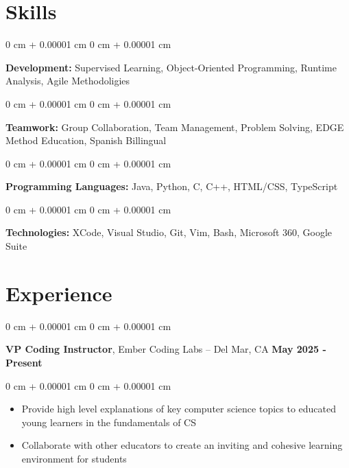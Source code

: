 \documentclass[10pt, letterpaper]{article}
\newenvironment{highlights}{
    \begin{itemize}[
        topsep=0.10 cm,
        parsep=0.10 cm,
        partopsep=0pt,
        itemsep=0pt,
        leftmargin=0 cm + 10pt
    ]
}{
    \end{itemize}
} %
\newenvironment{onecolentry}{
    \begin{adjustwidth}{
        0 cm + 0.00001 cm
    }{
        0 cm + 0.00001 cm
    }
}{
    \end{adjustwidth}
} %
\newenvironment{twocolentry}[2][]{
    \onecolentry%
    \def\secondColumn{#2}
    \setcolumnwidth{\fill, 6.0 cm}
    \begin{paracol}{2}
}{
    \switchcolumn\raggedleft\secondColumn%
    \end{paracol}
    \endonecolentry%
} %
\begin{document}
    
    
    {\color{secondaryColor}\section{Skills}}
        
        \begin{onecolentry}
            \textbf{Development:} Supervised Learning, Object-Oriented Programming, Runtime Analysis, Agile Methodoligies
        \end{onecolentry}

        \vspace{0.10 cm}

        \begin{onecolentry}
            \textbf{Teamwork:} Group Collaboration, Team Management, Problem Solving, EDGE Method Education, Spanish Billingual
        \end{onecolentry}

        \vspace{0.10 cm}
        
        \begin{onecolentry}
            \textbf{Programming Languages:} Java, Python, C, C++, HTML/CSS, TypeScript
        \end{onecolentry}

        \vspace{0.10 cm}
        
        \begin{onecolentry}
            \textbf{Technologies:} XCode, Visual Studio, Git, Vim, Bash, Microsoft 360, Google Suite
        \end{onecolentry}
    
    {\color{secondaryColor}\section{Experience}}


        
        \begin{twocolentry}{
            {\color{secondaryColor}\textbf{May 2025 - Present}}
        }
            \textbf{VP Coding Instructor}, Ember Coding Labs -- Del Mar, CA\end{twocolentry}

        \vspace{0.10 cm}
        \begin{onecolentry}
            \begin{highlights}
                \item Provide high level explanations of key computer science topics to educated young learners in the fundamentals of CS
                \item Collaborate with other educators to create an inviting and cohesive learning environment for students
            \end{highlights}
        \end{onecolentry}
\end{document}
